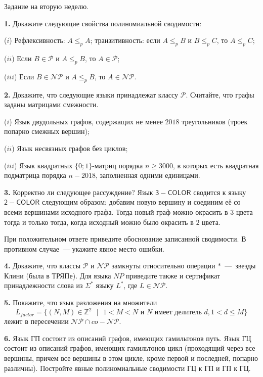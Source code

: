 \documentclass[12pt,a5paper,fleqn]{article}
\begin{document}
\begin{center}
{ \Large Задание на вторую неделю.}

\end{center}

{\bf 1.} Докажите следующие свойства полиномиальной сводимости:

($i$) Рефлексивность: $A\leq_p A$; транзитивность: если $A\leq_p B$ и $B\leq_p C$, то $A\leq_p C$;

($ii$) Если $B\in\mathcal{P}$ и $A\leq_p B$, то $A\in\mathcal{P}$;

($iii$) Если $B\in\mathcal{NP}$ и $A\leq_p B$, то $A\in\mathcal{NP}$.

\smallskip

{\bf 2.} Докажите, что следующие языки принадлежат классу $\mathcal{P}$. Считайте, что графы заданы матрицами смежности.

($i$) Язык двудольных графов, содержащих не менее $2018$ треугольников (троек попарно смежных вершин);

($ii$) Язык несвязных графов без циклов;

($iii$) Язык квадратных $\{0; 1\}$-матриц порядка $n\geq 3000$, в которых есть квадратная подматрица порядка $n-2018$, заполненная одними единицами.

\smallskip

{\bf 3.} Корректно ли следующее  рассуждение? Язык $\mathsf{3-COLOR}$ сводится к языку $\mathsf{2-COLOR}$ следующим образом: добавим новую вершину и соединим её со всеми вершинами исходного графа. Тогда новый граф можно окрасить в $3$ цвета тогда и только тогда, когда исходный можно было окрасить в $2$ цвета.

При положительном ответе приведите обоснование записанной сводимости. В противном случае~--- укажите явное место ошибки.

\smallskip

{\bf 4.} Докажите, что классы $\mathcal{P}$ и $\mathcal{NP}$ замкнуты относительно операции $*$~---~звезды Клини (была в ТРЯПе). Для языка $NP$ приведите также и сертификат принадлежности слова из $\Sigma^*$ языку $L^*$, где $L\in\mathcal{NP}$. 

\smallskip


{\bf 5.} Покажите, что язык разложения на множители $$L_{factor} = \{(N,M)\in\mathbb{Z}^2 \mbox{ }|\mbox{ } 1<M<N\mbox{ и } N \mbox{ имеет делитель } d, 1<d\leq M\}$$ лежит в пересечении $\mathcal{NP}\cap co-\mathcal{NP}$. 

\smallskip

{\bf 6.} Язык ГП состоит из описаний графов, имеющих гамильтонов путь. Язык ГЦ состоит из описаний графов, имеющих  гамильтонов цикл (проходящий через все вершины, причем все вершины в этом цикле, кроме первой и последней, попарно различны). Постройте явные полиномиальные сводимости ГЦ к ГП и ГП к ГЦ.
\end{document}
